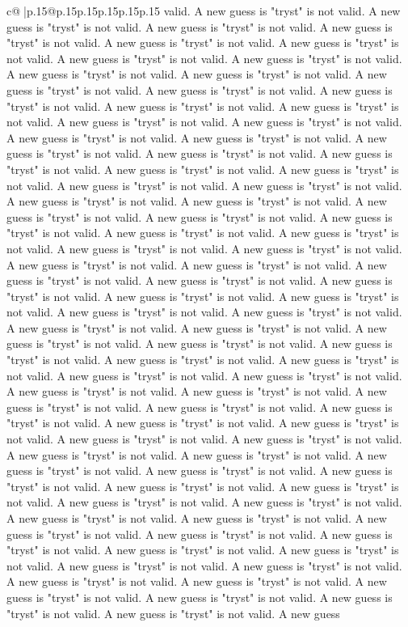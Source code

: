 \documentclass{article}
\begin{document}
{\begin{supertabular}{c@{$\;$}|p{.15\linewidth}@{}p{.15\linewidth}p{.15\linewidth}p{.15\linewidth}p{.15\linewidth}p{.15\linewidth}}
{{{valid. A new guess is "tryst" is not valid. A new guess is "tryst" is not valid. A new guess is "tryst" is not valid. A new guess is "tryst" is not valid. A new guess is "tryst" is not valid. A new guess is "tryst" is not valid. A new guess is "tryst" is not valid. A new guess is "tryst" is not valid. A new guess is "tryst" is not valid. A new guess is "tryst" is not valid. A new guess is "tryst" is not valid. A new guess is "tryst" is not valid. A new guess is "tryst" is not valid. A new guess is "tryst" is not valid. A new guess is "tryst" is not valid. A new guess is "tryst" is not valid. A new guess is "tryst" is not valid. A new guess is "tryst" is not valid. A new guess is "tryst" is not valid. A new guess is "tryst" is not valid. A new guess is "tryst" is not valid. A new guess is "tryst" is not valid. A new guess is "tryst" is not valid. A new guess is "tryst" is not valid. A new guess is "tryst" is not valid. A new guess is "tryst" is not valid. A new guess is "tryst" is not valid. A new guess is "tryst" is not valid. A new guess is "tryst" is not valid. A new guess is "tryst" is not valid. A new guess is "tryst" is not valid. A new guess is "tryst" is not valid. A new guess is "tryst" is not valid. A new guess is "tryst" is not valid. A new guess is "tryst" is not valid. A new guess is "tryst" is not valid. A new guess is "tryst" is not valid. A new guess is "tryst" is not valid. A new guess is "tryst" is not valid. A new guess is "tryst" is not valid. A new guess is "tryst" is not valid. A new guess is "tryst" is not valid. A new guess is "tryst" is not valid. A new guess is "tryst" is not valid. A new guess is "tryst" is not valid. A new guess is "tryst" is not valid. A new guess is "tryst" is not valid. A new guess is "tryst" is not valid. A new guess is "tryst" is not valid. A new guess is "tryst" is not valid. A new guess is "tryst" is not valid. A new guess is "tryst" is not valid. A new guess is "tryst" is not valid. A new guess is "tryst" is not valid. A new guess is "tryst" is not valid. A new guess is "tryst" is not valid. A new guess is "tryst" is not valid. A new guess is "tryst" is not valid. A new guess is "tryst" is not valid. A new guess is "tryst" is not valid. A new guess is "tryst" is not valid. A new guess is "tryst" is not valid. A new guess is "tryst" is not valid. A new guess is "tryst" is not valid. A new guess is "tryst" is not valid. A new guess is "tryst" is not valid. A new guess is "tryst" is not valid. A new guess is "tryst" is not valid. A new guess is "tryst" is not valid. A new guess is "tryst" is not valid. A new guess is "tryst" is not valid. A new guess is "tryst" is not valid. A new guess is "tryst" is not valid. A new guess is "tryst" is not valid. A new guess is "tryst" is not valid. A new guess is "tryst" is not valid. A new guess is "tryst" is not valid. A new guess is "tryst" is not valid. A new guess is "tryst" is not valid. A new guess is "tryst" is not valid. A new guess is "tryst" is not valid. A new guess is "tryst" is not valid. A new guess is "tryst" is not valid. A new guess is "tryst" is not valid. A new guess is "tryst" is not valid. A new guess is "tryst" is not valid. A new guess }}}
\end{supertabular}}
\end{document}
